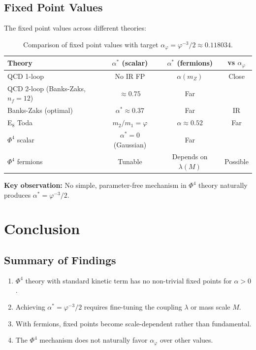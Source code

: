 \documentclass{article}
\begin{document}
\subsection{Fixed Point Values}

The fixed point values across different theories:

\begin{table}[h]
\centering
\caption{Comparison of fixed point values with target $\alpha_\varphi = \varphi^{-3}/2 \approx 0.118034$.}
\label{tab:fp-comparison}
\renewcommand{\arraystretch}{1.2}
\begin{tabular}{lccc}
\toprule
Theory & $\alpha^*$ (scalar) & $\alpha^*$ (fermions) & vs $\alpha_\varphi$ \\
\midrule
QCD 1-loop & No IR FP & $\alpha(m_Z)$ & Close \\
QCD 2-loop (Banks-Zaks, $n_f=12$) & $\approx 0.75$ & Far \\
Banks-Zaks (optimal) & $\alpha^* \approx 0.37$ & Far & IR \\
E$_8$ Toda & $m_2/m_1 = \varphi$ & $\alpha \approx 0.52$ & Far \\
$\Phi^4$ scalar & $\alpha^* = 0$ (Gaussian) & Far \\
$\Phi^4$ fermions & Tunable & Depends on $\lambda(M)$ & Possible \\
\bottomrule
\end{tabular}

\textbf{Key observation:} No simple, parameter-free mechanism in $\Phi^4$ theory naturally produces $\alpha^* = \varphi^{-3}/2$.

\section{Conclusion}

\subsection{Summary of Findings}

\begin{enumerate}
  \item $\Phi^4$ theory with standard kinetic term has no non-trivial fixed points for $\alpha > 0$.
  \item Achieving $\alpha^* = \varphi^{-3}/2$ requires fine-tuning the coupling $\lambda$ or mass scale $M$.
  \item With fermions, fixed points become scale-dependent rather than fundamental.
  \item The $\Phi^4$ mechanism does not naturally favor $\alpha_\varphi$ over other values.
\end{enumerate}


\end{table}
\end{document}
